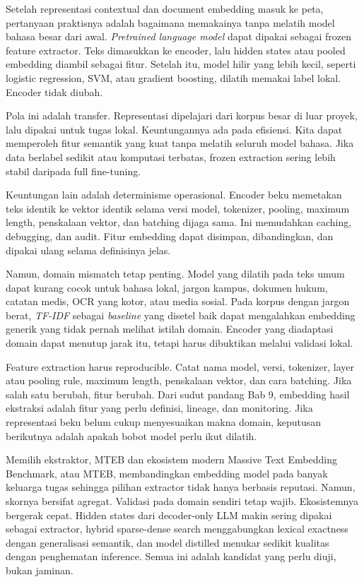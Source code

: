 Setelah representasi contextual dan document embedding masuk ke peta, pertanyaan praktisnya adalah bagaimana memakainya tanpa melatih model bahasa besar dari awal. \emph{Pretrained language model} dapat dipakai sebagai frozen feature extractor. Teks dimasukkan ke encoder, lalu hidden states atau pooled embedding diambil sebagai fitur. Setelah itu, model hilir yang lebih kecil, seperti logistic regression, SVM, atau gradient boosting, dilatih memakai label lokal. Encoder tidak diubah.

Pola ini adalah transfer. Representasi dipelajari dari korpus besar di luar proyek, lalu dipakai untuk tugas lokal. Keuntungannya ada pada efisiensi. Kita dapat memperoleh fitur semantik yang kuat tanpa melatih seluruh model bahasa. Jika data berlabel sedikit atau komputasi terbatas, frozen extraction sering lebih stabil daripada full fine-tuning.

Keuntungan lain adalah determinisme operasional. Encoder beku memetakan teks identik ke vektor identik selama versi model, tokenizer, pooling, maximum length, penskalaan vektor, dan batching dijaga sama. Ini memudahkan caching, debugging, dan audit. Fitur embedding dapat disimpan, dibandingkan, dan dipakai ulang selama definisinya jelas.

Namun, domain mismatch tetap penting. Model yang dilatih pada teks umum dapat kurang cocok untuk bahasa lokal, jargon kampus, dokumen hukum, catatan medis, OCR yang kotor, atau media sosial. Pada korpus dengan jargon berat, \emph{TF-IDF} sebagai \emph{baseline} yang disetel baik dapat mengalahkan embedding generik yang tidak pernah melihat istilah domain. Encoder yang diadaptasi domain dapat menutup jarak itu, tetapi harus dibuktikan melalui validasi lokal.

Feature extraction harus reproducible. Catat nama model, versi, tokenizer, layer atau pooling rule, maximum length, penskalaan vektor, dan cara batching. Jika salah satu berubah, fitur berubah. Dari sudut pandang Bab 9, embedding hasil ekstraksi adalah fitur yang perlu definisi, lineage, dan monitoring. Jika representasi beku belum cukup menyesuaikan makna domain, keputusan berikutnya adalah apakah bobot model perlu ikut dilatih.

\begin{pendalaman}{Memilih ekstraktor, MTEB dan ekosistem modern}
Massive Text Embedding Benchmark, atau MTEB, membandingkan embedding model pada banyak keluarga tugas sehingga pilihan extractor tidak hanya berbasis reputasi. Namun, skornya bersifat agregat. Validasi pada domain sendiri tetap wajib. Ekosistemnya bergerak cepat. Hidden states dari decoder-only LLM makin sering dipakai sebagai extractor, hybrid sparse-dense search menggabungkan lexical exactness dengan generalisasi semantik, dan model distilled menukar sedikit kualitas dengan penghematan inference. Semua ini adalah kandidat yang perlu diuji, bukan jaminan.
\end{pendalaman}

